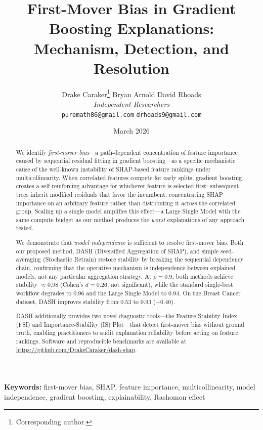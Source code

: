 \documentclass[11pt]{article}
\title{%
  \textbf{First-Mover Bias in Gradient Boosting Explanations:} \\[6pt]
  \large Mechanism, Detection, and Resolution
}
\author{
  Drake Caraker\thanks{Corresponding author.} \qquad
  Bryan Arnold \qquad
  David Rhoads \\[4pt]
  \textit{Independent Researchers} \\
  \texttt{puremath86@gmail.com} \quad \texttt{drhoads9@gmail.com}
}
\date{March 2026}
\newcommand{\dash}{\textsc{DASH}}
\newcommand{\rhovar}{\rho}
\begin{document}
\maketitle

\begin{abstract}
We identify \emph{first-mover bias}---a path-dependent concentration of
feature importance caused by sequential residual fitting in gradient
boosting---as a specific mechanistic cause of the well-known instability of
SHAP-based feature rankings under multicollinearity. When correlated features
compete for early splits, gradient boosting creates a self-reinforcing
advantage for whichever feature is selected first: subsequent trees inherit
modified residuals that favor the incumbent, concentrating SHAP importance on
an arbitrary feature rather than distributing it across the correlated group.
Scaling up a single model amplifies this effect---a Large Single Model with
the same compute budget as our method produces the \emph{worst} explanations
of any approach tested.

We demonstrate that \emph{model independence} is sufficient to resolve
first-mover bias. Both our proposed method, \dash{} (Diversified Aggregation
of SHAP), and simple seed-averaging (Stochastic Retrain) restore stability
by breaking the sequential dependency chain, confirming that the operative
mechanism is independence between explained models, not any particular
aggregation strategy. At $\rhovar = 0.9$, both methods achieve stability
$\approx 0.98$ (Cohen's $d = 0.26$, not significant), while the standard
single-best workflow degrades to $0.96$ and the Large Single Model to
$0.94$. On the Breast Cancer dataset, \dash{} improves stability from
$0.53$ to $0.93$ ($+0.40$).

\dash{} additionally provides two novel diagnostic tools---the Feature
Stability Index (FSI) and Importance-Stability (IS) Plot---that detect
first-mover bias without ground truth, enabling practitioners to audit
explanation reliability before acting on feature rankings. Software and
reproducible benchmarks are available at
\url{https://github.com/DrakeCaraker/dash-shap}.
\end{abstract}

\textbf{Keywords:} first-mover bias, SHAP, feature importance, multicollinearity,
model independence, gradient boosting, explainability, Rashomon effect

\end{document}
